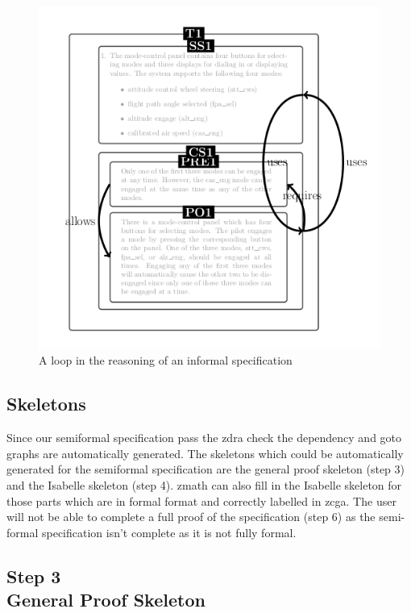 \begin{figure}[H]
\begin{minipage}{0.45\textwidth}
     \includegraphics[width=\linewidth]{Figures/fullexample/ifincorrectout.png}
     \caption{A loop in the reasoning of an informal specification \label{fig:ifzdraincorrectout}}
     \end{minipage}
     \end{figure}

 \subsection{Skeletons}

 Since our semiformal specification pass the \gls{zdra} check the dependency and
 goto graphs are automatically generated. The skeletons which could be
 automatically generated for the semiformal specification are the general proof
 skeleton (step 3) and the Isabelle skeleton (step 4). \Gls{zmath} can also fill
 in the Isabelle skeleton for those parts which are in formal format and
 correctly labelled in \gls{zcga}. The user will not be able to complete a full
 proof of the specification (step 6) as the semi-formal specification isn't
 complete as it is not fully formal.

 \subsection{Step 3\\General Proof Skeleton}

